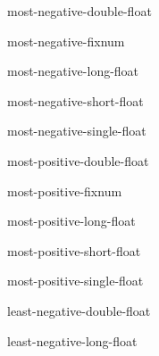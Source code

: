 \begin{constant}{most-negative-double-float}{}{}{}
  
\end{constant}

\begin{constant}{most-negative-fixnum}{}{}{}
  
\end{constant}

\begin{constant}{most-negative-long-float}{}{}{}
  
\end{constant}

\begin{constant}{most-negative-short-float}{}{}{}
  
\end{constant}

\begin{constant}{most-negative-single-float}{}{}{}
  
\end{constant}

\begin{constant}{most-positive-double-float}{}{}{}
  
\end{constant}

\begin{constant}{most-positive-fixnum}{}{}{}
  
\end{constant}

\begin{constant}{most-positive-long-float}{}{}{}
  
\end{constant}

\begin{constant}{most-positive-short-float}{}{}{}
  
\end{constant}

\begin{constant}{most-positive-single-float}{}{}{}
  
\end{constant}

\begin{constant}{least-negative-double-float}{}{}{}
  
\end{constant}

\begin{constant}{least-negative-long-float}{}{}{}
  
\end{constant}

